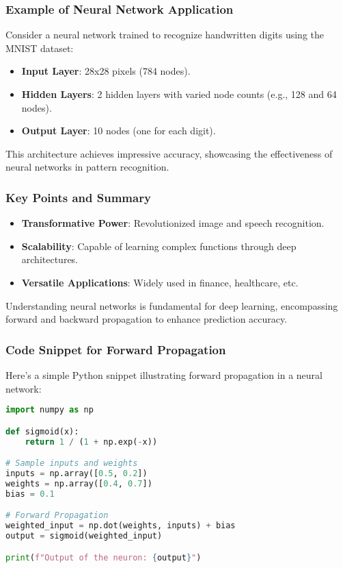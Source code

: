 \documentclass[aspectratio=169]{beamer}
\begin{document}
\begin{frame}[fragile]
    \frametitle{Example of Neural Network Application}
    Consider a neural network trained to recognize handwritten digits using the MNIST dataset:
    \begin{itemize}
        \item \textbf{Input Layer}: 28x28 pixels (784 nodes).
        \item \textbf{Hidden Layers}: 2 hidden layers with varied node counts (e.g., 128 and 64 nodes).
        \item \textbf{Output Layer}: 10 nodes (one for each digit).
    \end{itemize}
    This architecture achieves impressive accuracy, showcasing the effectiveness of neural networks in pattern recognition.
\end{frame}

\begin{frame}
    \frametitle{Key Points and Summary}
    \begin{itemize}
        \item \textbf{Transformative Power}: Revolutionized image and speech recognition.
        \item \textbf{Scalability}: Capable of learning complex functions through deep architectures.
        \item \textbf{Versatile Applications}: Widely used in finance, healthcare, etc.
    \end{itemize}
    Understanding neural networks is fundamental for deep learning, encompassing forward and backward propagation to enhance prediction accuracy.
\end{frame}

\begin{frame}[fragile]
    \frametitle{Code Snippet for Forward Propagation}
    Here’s a simple Python snippet illustrating forward propagation in a neural network:
    \begin{lstlisting}[language=Python]
import numpy as np

def sigmoid(x):
    return 1 / (1 + np.exp(-x))

# Sample inputs and weights
inputs = np.array([0.5, 0.2])
weights = np.array([0.4, 0.7])
bias = 0.1

# Forward Propagation
weighted_input = np.dot(weights, inputs) + bias
output = sigmoid(weighted_input)

print(f"Output of the neuron: {output}")
    \end{lstlisting}
\end{frame}
\end{document}
